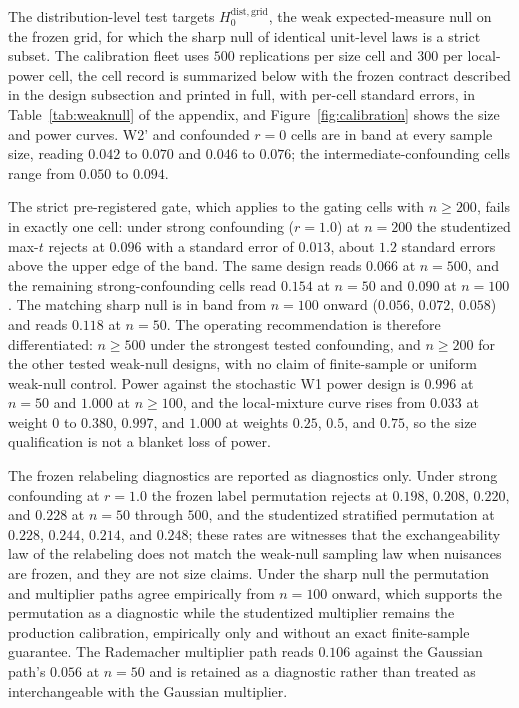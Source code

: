 The distribution-level test targets $H_0^{\mathrm{dist,grid}}$, the weak expected-measure null on the frozen grid, for which the sharp null of identical unit-level laws is a strict subset. The calibration fleet uses $500$ replications per size cell and $300$ per local-power cell, the cell record is summarized below with the frozen contract described in the design subsection and printed in full, with per-cell standard errors, in Table~\ref{tab:weaknull} of the appendix, and Figure~\ref{fig:calibration} shows the size and power curves. W2' and confounded $r=0$ cells are in band at every sample size, reading $0.042$ to $0.070$ and $0.046$ to $0.076$; the intermediate-confounding cells range from $0.050$ to $0.094$.

The strict pre-registered gate, which applies to the gating cells with $n \ge 200$, fails in exactly one cell: under strong confounding ($r=1.0$) at $n=200$ the studentized max-$t$ rejects at $0.096$ with a standard error of $0.013$, about $1.2$ standard errors above the upper edge of the band. The same design reads $0.066$ at $n=500$, and the remaining strong-confounding cells read $0.154$ at $n=50$ and $0.090$ at $n=100$. The matching sharp null is in band from $n=100$ onward ($0.056$, $0.072$, $0.058$) and reads $0.118$ at $n=50$. The operating recommendation is therefore differentiated: $n \ge 500$ under the strongest tested confounding, and $n \ge 200$ for the other tested weak-null designs, with no claim of finite-sample or uniform weak-null control. Power against the stochastic W1 power design is $0.996$ at $n=50$ and $1.000$ at $n \ge 100$, and the local-mixture curve rises from $0.033$ at weight $0$ to $0.380$, $0.997$, and $1.000$ at weights $0.25$, $0.5$, and $0.75$, so the size qualification is not a blanket loss of power.

The frozen relabeling diagnostics are reported as diagnostics only. Under strong confounding at $r=1.0$ the frozen label permutation rejects at $0.198$, $0.208$, $0.220$, and $0.228$ at $n=50$ through $500$, and the studentized stratified permutation at $0.228$, $0.244$, $0.214$, and $0.248$; these rates are witnesses that the exchangeability law of the relabeling does not match the weak-null sampling law when nuisances are frozen, and they are not size claims. Under the sharp null the permutation and multiplier paths agree empirically from $n=100$ onward, which supports the permutation as a diagnostic while the studentized multiplier remains the production calibration, empirically only and without an exact finite-sample guarantee. The Rademacher multiplier path reads $0.106$ against the Gaussian path's $0.056$ at $n=50$ and is retained as a diagnostic rather than treated as interchangeable with the Gaussian multiplier.

